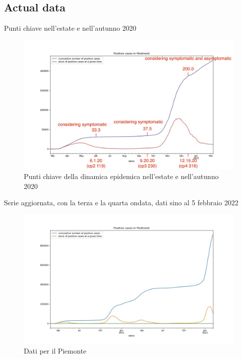 \documentclass[]{beamer}
\begin{document}
\subsection{Actual data}

\begin{frame}{Punti chiave nell'estate e nell'autunno 2020}

\begin{figure}[H]
\center
\includegraphics[scale=0.25]{andamento900annotato.jpg}
\caption{Punti chiave della dinamica epidemica nell'estate e nell'autunno 2020}
\label{Key points}
\end{figure}


\end{frame}


\begin{frame}{Serie aggiornata, con la terza e la quarta ondata, dati sino al 5 febbraio 2022}

\begin{figure}[H]
\center
\includegraphics[scale=0.35]{andamento900.jpg}
\caption{Dati per il Piemonte}
\label{dataP}
\end{figure}


\end{frame}
\end{document}
